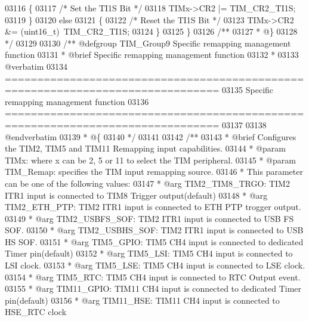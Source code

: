 \begin{DoxyCode}
03116   \{
03117     \textcolor{comment}{/* Set the TI1S Bit */}
03118     TIMx->CR2 |= TIM_CR2_TI1S;
03119   \}
03120   \textcolor{keywordflow}{else}
03121   \{
03122     \textcolor{comment}{/* Reset the TI1S Bit */}
03123     TIMx->CR2 &= (uint16\_t)~TIM_CR2_TI1S;
03124   \}
03125 \}
03126 \textcolor{comment}{/**}
03127 \textcolor{comment}{  * @\}}
03128 \textcolor{comment}{  */}
03129 
03130 \textcolor{comment}{/** @defgroup TIM\_Group9 Specific remapping management function}
03131 \textcolor{comment}{ *  @brief   Specific remapping management function}
03132 \textcolor{comment}{ *}
03133 \textcolor{comment}{@verbatim   }
03134 \textcolor{comment}{ ===============================================================================}
03135 \textcolor{comment}{                     Specific remapping management function}
03136 \textcolor{comment}{ ===============================================================================  }
03137 \textcolor{comment}{}
03138 \textcolor{comment}{@endverbatim}
03139 \textcolor{comment}{  * @\{}
03140 \textcolor{comment}{  */}
03141 
03142 \textcolor{comment}{/**}
03143 \textcolor{comment}{  * @brief  Configures the TIM2, TIM5 and TIM11 Remapping input capabilities.}
03144 \textcolor{comment}{  * @param  TIMx: where x can be 2, 5 or 11 to select the TIM peripheral.}
03145 \textcolor{comment}{  * @param  TIM\_Remap: specifies the TIM input remapping source.}
03146 \textcolor{comment}{  *          This parameter can be one of the following values:}
03147 \textcolor{comment}{  *            @arg TIM2\_TIM8\_TRGO: TIM2 ITR1 input is connected to TIM8 Trigger output(default)}
03148 \textcolor{comment}{  *            @arg TIM2\_ETH\_PTP:   TIM2 ITR1 input is connected to ETH PTP trogger output.}
03149 \textcolor{comment}{  *            @arg TIM2\_USBFS\_SOF: TIM2 ITR1 input is connected to USB FS SOF. }
03150 \textcolor{comment}{  *            @arg TIM2\_USBHS\_SOF: TIM2 ITR1 input is connected to USB HS SOF. }
03151 \textcolor{comment}{  *            @arg TIM5\_GPIO:      TIM5 CH4 input is connected to dedicated Timer pin(default)}
03152 \textcolor{comment}{  *            @arg TIM5\_LSI:       TIM5 CH4 input is connected to LSI clock.}
03153 \textcolor{comment}{  *            @arg TIM5\_LSE:       TIM5 CH4 input is connected to LSE clock.}
03154 \textcolor{comment}{  *            @arg TIM5\_RTC:       TIM5 CH4 input is connected to RTC Output event.}
03155 \textcolor{comment}{  *            @arg TIM11\_GPIO:     TIM11 CH4 input is connected to dedicated Timer pin(default) }
03156 \textcolor{comment}{  *            @arg TIM11\_HSE:      TIM11 CH4 input is connected to HSE\_RTC clock}

\end{DoxyCode}
